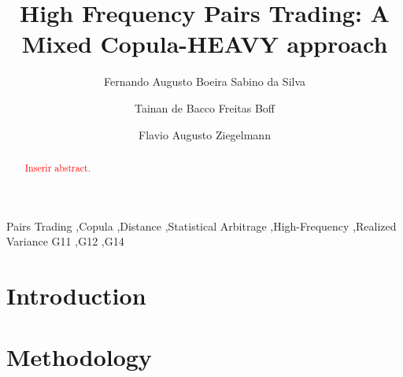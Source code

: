 \documentclass[review]{elsarticle}
\begin{document}
\begin{frontmatter}

\title{High Frequency Pairs Trading: A Mixed Copula-HEAVY approach}



\author[address1]{Fernando Augusto Boeira Sabino da Silva}

\author[address2]{Tainan de Bacco Freitas Boff}

\author[address1]{Flavio Augusto Ziegelmann}

\address[address1]{Department of Statistics, Institute of Mathematics and Statistics, Federal University of Rio Grande do Sul, 9500 Bento Gonçalves Av., 43-111, Porto Alegre, RS, 91509-900, Brazil}
\address[address2]{Graduate Program in Economics, Federal University of Rio Grande do Sul, Porto Alegre, Brazil}

\begin{abstract}
\textcolor{red}{Inserir abstract.}
\end{abstract}

\begin{keyword}
Pairs Trading \sep Copula \sep Distance \sep Statistical Arbitrage \sep High-Frequency \sep Realized Variance %
\JEL  G11 \sep G12 \sep G14 
\end{keyword}

\end{frontmatter}

\linenumbers

\section{Introduction}

\section{Methodology}
\end{document}
